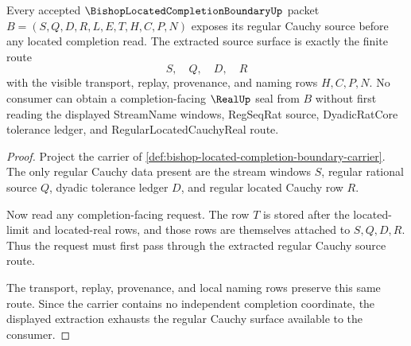 \begin{theorem}
\label{thm:bishop-located-completion-boundary-regular-cauchy-extraction}
Every accepted $\BishopLocatedCompletionBoundaryUp$ packet $B=(S,Q,D,R,L,E,T,H,C,P,N)$ exposes its regular Cauchy source before any located completion read. The extracted source surface is exactly the finite route
$$
S,\quad Q,\quad D,\quad R
$$
with the visible transport, replay, provenance, and naming rows $H,C,P,N$. No consumer can obtain a completion-facing $\RealUp$ seal from $B$ without first reading the displayed StreamName windows, RegSeqRat source, DyadicRatCore tolerance ledger, and RegularLocatedCauchyReal route.
\end{theorem}
\begin{proof}
Project the carrier of \autoref{def:bishop-located-completion-boundary-carrier}. The only regular Cauchy data present are the stream windows $S$, regular rational source $Q$, dyadic tolerance ledger $D$, and regular located Cauchy row $R$.

Now read any completion-facing request. The row $T$ is stored after the located-limit and located-real rows, and those rows are themselves attached to $S,Q,D,R$. Thus the request must first pass through the extracted regular Cauchy source route.

The transport, replay, provenance, and local naming rows preserve this same route. Since the carrier contains no independent completion coordinate, the displayed extraction exhausts the regular Cauchy surface available to the consumer.
\end{proof}

